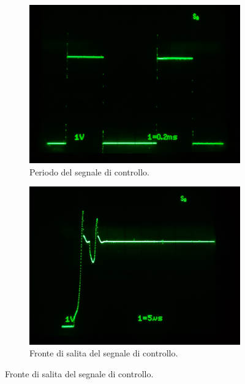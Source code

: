 \documentclass[12pt,twoside,openright]{report}
\begin{document}
\begin{figure}[h!]
\centering
\begin{subfigure}{0.48\textwidth}
    \includegraphics[width=\textwidth]{osc1.jpg}
    \caption{Periodo del segnale di controllo.}
    \label{fig:osc1}
\end{subfigure}
\hfill
\begin{subfigure}{0.48\textwidth}
    \includegraphics[width=\textwidth]{osc2.jpg}
    \caption{Fronte di salita del segnale di controllo.}
    \label{fig:osc2}
\end{subfigure}
\hfill
\end{figure}
\end{document}
